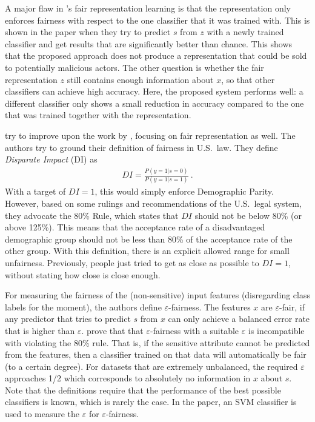 A major flaw in \citet{zemel2013learning}'s fair representation learning is
that the representation only enforces fairness
with respect to the one classifier that it was trained with.
This is shown in the paper when they try to predict \(s\) from \(z\) with a newly trained classifier
and get results that are significantly better than chance.
This shows that the proposed approach does not produce a representation
that could be sold to potentially malicious actors.
The other question is
whether the fair representation \(z\) still contains enough information about \(x\),
so that other classifiers can achieve high accuracy.
Here, the proposed system performs well:
a different classifier only shows a small reduction in accuracy
compared to the one that was trained together with the representation.

\citet{feldman2015certifying} try to improve upon the work by \citet{zemel2013learning},
focusing on fair representation as well.
The authors try to ground their definition of fairness in U.S.\ law.
They define \emph{Disparate Impact} (DI) as
\begin{align}
  \label{eq:disparate-impace}
  DI = \frac{P(y=1|s=0)}{P(y=1|s=1)} ~.
\end{align}
With a target of \(DI = 1\), this would simply enforce Demographic Parity.
However, based on some rulings and recommendations of the U.S.\ legal system,
they advocate the 80\% Rule, which states that \(DI\) should not be below 80\% (or above 125\%).
This means that the acceptance rate of a disadvantaged demographic group
should not be less than 80\% of the acceptance rate of the other group.
With this definition, there is an explicit allowed range for small unfairness.
Previously, people just tried to get as close as possible to \(DI = 1\),
without stating how close is close enough.

For measuring the fairness of the (non-sensitive) input features
(disregarding class labels for the moment), the authors define \(\varepsilon\)-fairness.
The features \(x\) are \(\varepsilon\)-fair,
if any predictor that tries to predict \(s\) from \(x\) can only achieve a balanced error rate
that is higher than \(\varepsilon\).
\citet{feldman2015certifying} prove that that \(\varepsilon\)-fairness with a suitable \(\varepsilon\)
is incompatible with violating the 80\% rule.
That is, if the sensitive attribute cannot be predicted from the features,
then a classifier trained on that data will automatically be fair (to a certain degree).
For datasets that are extremely unbalanced,
the required \(\varepsilon\) approaches 1/2
which corresponds to absolutely no information in \(x\) about \(s\).
Note that the definitions require that the performance of the best possible classifiers is known,
which is rarely the case.
In the paper, an \ac{SVM} classifier is used to measure the \(\varepsilon\) for \(\varepsilon\)-fairness.

